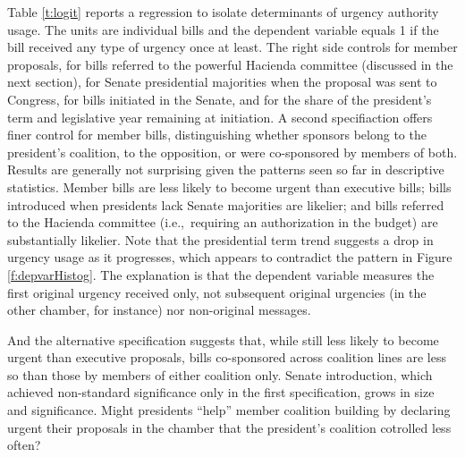 \documentclass[letter,12pt]{article}
\begin{document}
Table \ref{t:logit} reports a regression to isolate determinants of urgency authority usage. The units are individual bills and the dependent variable equals 1 if the bill received any type of urgency once at least. The right side controls for member proposals, for bills referred to the powerful Hacienda committee (discussed in the next section), for Senate presidential majorities when the proposal was sent to Congress, for bills initiated in the Senate, and for the share of the president's term and legislative year remaining at initiation. A second specifiaction offers finer control for member bills, distinguishing whether sponsors belong to the president's coalition, to the opposition, or were co-sponsored by members of both. Results are generally not surprising given the patterns seen so far in descriptive statistics. Member bills are less likely to become urgent than executive bills; bills introduced when presidents lack Senate majorities are likelier; and bills referred to the Hacienda committee (i.e.,\ requiring an authorization in the budget) are substantially likelier. Note that the presidential term trend suggests a drop in urgency usage as it progresses, which appears to contradict the pattern in Figure \ref{f:depvarHistog}. The explanation is that the dependent variable measures the first original urgency received only, not subsequent original urgencies (in the other chamber, for instance) nor non-original messages. 

And the alternative specification suggests that, while still less likely to become urgent than executive proposals, bills co-sponsored across coalition lines are less so than those by members of either coalition only. Senate introduction, which achieved non-standard significance only in the first specification, grows in size and significance. Might presidents ``help'' member coalition building by declaring urgent their proposals in the chamber that the president's coalition cotrolled less often?
\end{document}
